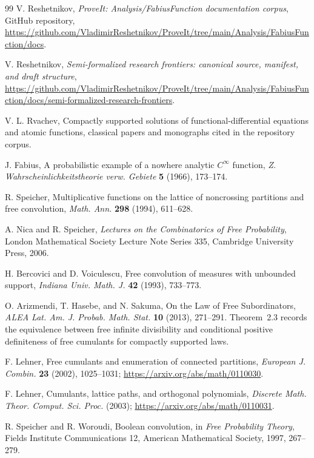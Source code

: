 \documentclass[11pt,oneside]{article}
\theoremstyle{definition}
\theoremstyle{remark}
\begin{document}
\begin{thebibliography}{99}
V. Reshetnikov,
\emph{ProveIt: Analysis/FabiusFunction documentation corpus},
GitHub repository,
\url{https://github.com/VladimirReshetnikov/ProveIt/tree/main/Analysis/FabiusFunction/docs}.

V. Reshetnikov,
\emph{Semi-formalized research frontiers: canonical source, manifest, and draft structure},
\url{https://github.com/VladimirReshetnikov/ProveIt/tree/main/Analysis/FabiusFunction/docs/semi-formalized-research-frontiers}.

V. L. Rvachev,
Compactly supported solutions of functional-differential equations and atomic functions,
classical papers and monographs cited in the repository corpus.

J. Fabius,
A probabilistic example of a nowhere analytic \(C^\infty\) function,
\emph{Z. Wahrscheinlichkeitstheorie verw. Gebiete} \textbf{5} (1966), 173--174.

R. Speicher,
Multiplicative functions on the lattice of noncrossing partitions and free convolution,
\emph{Math. Ann.} \textbf{298} (1994), 611--628.

A. Nica and R. Speicher,
\emph{Lectures on the Combinatorics of Free Probability},
London Mathematical Society Lecture Note Series 335, Cambridge University Press, 2006.

H. Bercovici and D. Voiculescu,
Free convolution of measures with unbounded support,
\emph{Indiana Univ. Math. J.} \textbf{42} (1993), 733--773.

O. Arizmendi, T. Hasebe, and N. Sakuma,
On the Law of Free Subordinators,
\emph{ALEA Lat. Am. J. Probab. Math. Stat.} \textbf{10} (2013), 271--291.
Theorem~2.3 records the equivalence between free infinite divisibility and conditional positive definiteness of free cumulants for compactly supported laws.

F. Lehner,
Free cumulants and enumeration of connected partitions,
\emph{European J. Combin.} \textbf{23} (2002), 1025--1031;
\url{https://arxiv.org/abs/math/0110030}.

F. Lehner,
Cumulants, lattice paths, and orthogonal polynomials,
\emph{Discrete Math. Theor. Comput. Sci. Proc.} (2003);
\url{https://arxiv.org/abs/math/0110031}.

R. Speicher and R. Woroudi,
Boolean convolution,
in \emph{Free Probability Theory}, Fields Institute Communications 12,
American Mathematical Society, 1997, 267--279.


\end{thebibliography}
\end{document}
